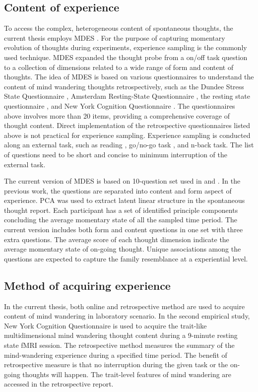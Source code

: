 \subsection{Content of experience}

To access the complex, heterogeneous content of spontaneous thoughts, the current thesis employs MDES \cite{Medea2016, RubyPlos2013, Smallwood2016}. For the purpose of capturing momentary evolution of thoughts during experiments, experience sampling \cite{Kahneman2004} is the commonly used technique. MDES expanded the thought probe from a on/off task question to a collection of dimensions related to a wide range of form and content of thoughts. The idea of MDES is based on various questionnaires to understand the content of mind wandering thoughts retrospectively, such as the Dundee Stress State Questionnaire \cite{Matthews1999}, Amsterdam Resting-State Questionnaire \cite{Diaz2013}, the resting state questionnaire \cite{Delamillieure2010}, and New York Cognition Questionnaire \cite{Gorgolewski2014}. The questionnaires above involves more than 20 items, providing a comprehensive coverage of thought content. Direct implementation of the retrospective questionnaires listed above is not practical for experience sampling. Experience sampling is conducted along an external task, such as reading \cite{Franklin2011}, go/no-go task \cite{Christoff2009}, and n-back task\cite{Kane2007}. The list of questions need to be short and concise to minimum interruption of the external task. 

The current version of MDES is based on 10-question set used in \cite{Medea2016} and . In the previous work, the questions are separated into content and form aspect of experience. PCA was used to extract latent linear structure in the spontaneous thought report. Each participant has a set of identified principle components concluding the average momentary state of all the sampled time period. The current version includes both form and content questions in one set with three extra questions. The average score of each thought dimension indicate the average momentary state of on-going thought. Unique associations among the questions are expected to capture the family resemblance at a experiential level. 

\subsection{Method of acquiring experience}

In the current thesis, both online and retrospective method are used to acquire content of mind wandering in laboratory scenario. In the second empirical study, New York Cognition Questionnaire \cite{Gorgolewski2014} is used to acquire the trait-like multidimensional mind wandering thought content during a 9-minute resting state fMRI session. The retrospective method measures the summary of the mind-wandering experience during a specified time period. The benefit of retrospective measure is that no interruption during the given task or the on-going thoughts will happen. The trait-level features of mind wandering are accessed in the retrospective report. 

